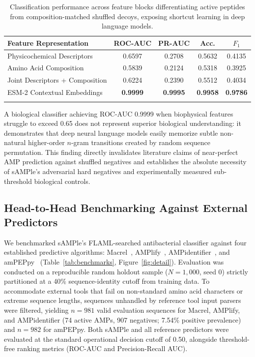 \documentclass[unnumsec,webpdf,contemporary,large]{oup-authoring-template}%
\begin{document}
\begin{table}[!t]
\caption{Classification performance across feature blocks differentiating active peptides from composition-matched shuffled decoys, exposing shortcut learning in deep language models.}\label{tab:shortcuts}
\begin{center}
\begin{tabular*}{\columnwidth}{@{\extracolsep\fill}lcccc@{\extracolsep\fill}}
\toprule
Feature Representation & ROC-AUC & PR-AUC & Acc. & $F_1$ \\
\midrule
Physicochemical Descriptors & 0.6597 & 0.2708 & 0.5632 & 0.4135 \\
Amino Acid Composition & 0.5839 & 0.2124 & 0.5318 & 0.3925 \\
Joint Descriptors + Composition & 0.6224 & 0.2390 & 0.5512 & 0.4034 \\
ESM-2 Contextual Embeddings & \textbf{0.9999} & \textbf{0.9995} & \textbf{0.9958} & \textbf{0.9786} \\
\botrule
\end{tabular*}
\end{center}
\end{table}

A biological classifier achieving ROC-AUC 0.9999 when biophysical features struggle to exceed 0.65 does not represent superior biological understanding: it demonstrates that deep neural language models easily memorize subtle non-natural higher-order $n$-gram transitions created by random sequence permutation. This finding directly invalidates literature claims of near-perfect AMP prediction against shuffled negatives and establishes the absolute necessity of sAMPle's adversarial hard negatives and experimentally measured sub-threshold biological controls.

\subsection{Head-to-Head Benchmarking Against External Predictors}

We benchmarked sAMPle's FLAML-searched antibacterial classifier against four established predictive algorithms: Macrel~\cite{santos2020macrel}, AMPlify~\cite{li2022amplify}, AMPidentifier~\cite{luna2025ampidentifier}, and amPEPpy~\cite{lawrence2021ampeppy} (Table~\ref{tab:benchmarks}, Figure~\ref{fig:detail}). Evaluation was conducted on a reproducible random holdout sample ($N = 1,000$, seed 0) strictly partitioned at a 40\% sequence-identity cutoff from training data. To accommodate external tools that fail on non-standard amino acid characters or extreme sequence lengths, sequences unhandled by reference tool input parsers were filtered, yielding $n=981$ valid evaluation sequences for Macrel, AMPlify, and AMPidentifier (74 active AMPs, 907 negatives; 7.54\% positive prevalence) and $n=982$ for amPEPpy. Both sAMPle and all reference predictors were evaluated at the standard operational decision cutoff of 0.50, alongside threshold-free ranking metrics (ROC-AUC and Precision-Recall AUC).
\end{document}
